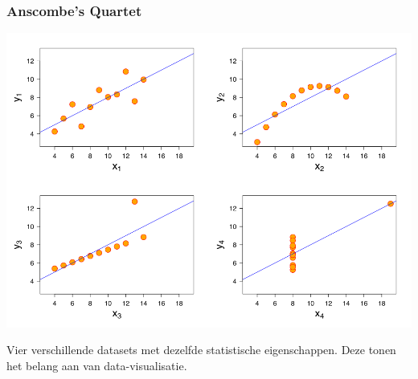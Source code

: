 \documentclass{beamer}
\begin{document}
\begin{frame}
  \frametitle{Anscombe's Quartet}

  \centering
  \includegraphics[width=.8\textwidth]{img/anscombes_quartet}

  Vier verschillende datasets met dezelfde statistische eigenschappen. Deze tonen het belang aan van data-visualisatie.
\end{frame}
\end{document}
